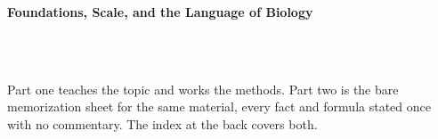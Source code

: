 



\makeindex[title={Index of This Volume},columns=2,intoc]

\begin{titlepage}\thispagestyle{empty}
\vspace*{0.14\textheight}
\noindent{\color{tiercore}\rule{\textwidth}{5pt}}\\[3pt]
\noindent{\color{bioline}\rule{\textwidth}{1pt}}\\[26pt]
\\[12pt]
\noindent\begin{minipage}{\textwidth}\raggedright
{\sffamily\bfseries\fontsize{28}{32}\selectfont\color{bioink}%
 \hyphenchar{} Foundations, Scale, and the Language of Biology\par}\end{minipage}\\[16pt]
\noindent{\color{biogreen}\rule{\textwidth}{1.4pt}}\\[10pt]
\noindent\begin{minipage}{\textwidth}\raggedright
{\fontsize{10.5}{14}\selectfont\color{biogreen}%
Part one teaches the topic and works the methods. Part two is the bare memorization sheet for the
same material, every fact and formula stated once with no commentary. The index at the back covers both.\par}\end{minipage}
\vfill
\noindent{\color{bioline}\rule{\textwidth}{1pt}}\\[3pt]
\noindent{\color{tiercore}\rule{\textwidth}{5pt}}
\end{titlepage}
\tableofcontents
\clearpage
{}
\clearpage
\printindex

